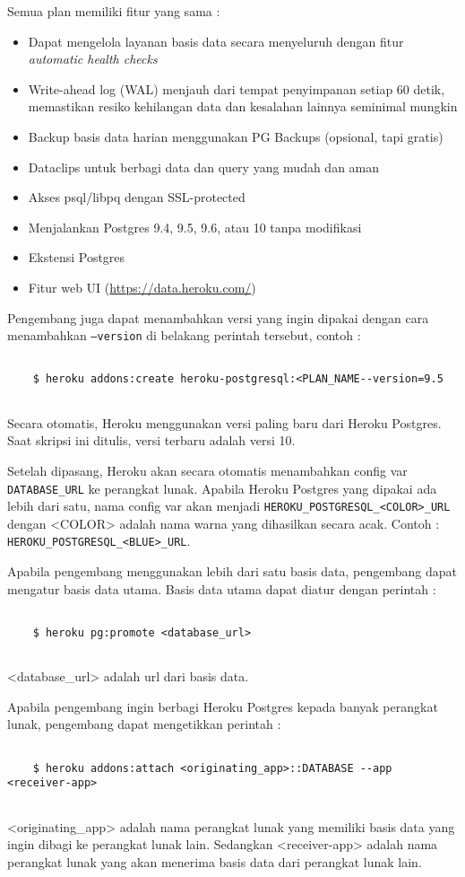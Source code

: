 Semua plan memiliki fitur yang sama :
\begin{itemize}
\item Dapat mengelola layanan basis data secara menyeluruh dengan fitur \textit{automatic health checks}
\item Write-ahead log (WAL) menjauh dari tempat penyimpanan setiap 60 detik, memastikan resiko kehilangan data dan kesalahan lainnya seminimal mungkin
\item Backup basis data harian menggunakan PG Backups (opsional, tapi gratis)
\item Dataclips untuk berbagi data dan query yang mudah dan aman
\item Akses psql/libpq dengan SSL-protected
\item Menjalankan Postgres 9.4, 9.5, 9.6, atau 10 tanpa modifikasi
\item Ekstensi Postgres
\item Fitur web UI (\url{https://data.heroku.com/})
\end{itemize}

Pengembang juga dapat menambahkan versi yang ingin dipakai dengan cara menambahkan \texttt{--version} di belakang perintah tersebut, contoh :
\begin{lstlisting}
	
	$ heroku addons:create heroku-postgresql:<PLAN_NAME--version=9.5
	
\end{lstlisting}
Secara otomatis, Heroku menggunakan versi paling baru dari Heroku Postgres. Saat skripsi ini ditulis, versi terbaru adalah versi 10.

Setelah dipasang, Heroku akan secara otomatis menambahkan config var \texttt{DATABASE\_URL} ke perangkat lunak. Apabila Heroku Postgres yang dipakai ada lebih dari satu, nama config var akan menjadi \texttt{HEROKU\_POSTGRESQL\_<COLOR>\_URL} dengan <COLOR> adalah nama warna yang dihasilkan secara acak. Contoh : \texttt{HEROKU\_POSTGRESQL\_<BLUE>\_URL}.

Apabila pengembang menggunakan lebih dari satu basis data, pengembang dapat mengatur basis data utama. Basis data utama dapat diatur dengan perintah :
\begin{lstlisting}
	
	$ heroku pg:promote <database_url>
	
\end{lstlisting}
<database\_url> adalah url dari basis data.

Apabila pengembang ingin berbagi Heroku Postgres kepada banyak perangkat lunak, pengembang dapat mengetikkan perintah : 
\begin{lstlisting}

	$ heroku addons:attach <originating_app>::DATABASE --app <receiver-app>
	
\end{lstlisting}
<originating\_app> adalah nama perangkat lunak yang memiliki basis data yang ingin dibagi ke perangkat lunak lain. Sedangkan <receiver-app> adalah nama perangkat lunak yang akan menerima basis data dari perangkat lunak lain.


